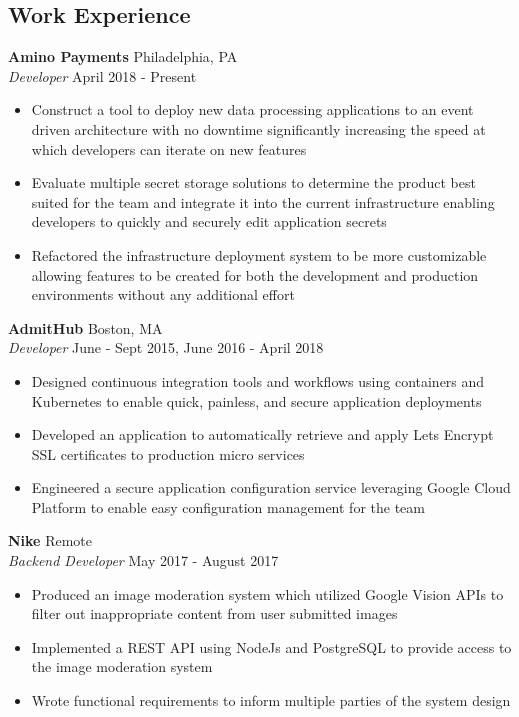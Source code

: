 \documentclass[10pt]{article}
\begin{document}
\begin{flushleft}
\section{Work Experience}
	\textbf{Amino Payments} \hfill Philadelphia, PA \\
	\textit{Developer} \hfill April 2018 - Present \\
	\begin{itemize}
		\item Construct a tool to deploy new data processing 
		      applications to an event driven architecture with no 
		      downtime significantly increasing the speed at which
		      developers can iterate on new features
	        \item Evaluate multiple secret storage solutions to determine 
		      the product best suited for the team and integrate it 
		      into the current infrastructure enabling developers to 
		      quickly and securely edit application secrets
	        \item Refactored the infrastructure deployment system to be more 
		      customizable allowing features to be created for both the 
		      development and production environments without any 
		      additional effort
	\end{itemize}


	\vspace{0.5em}
	\textbf{AdmitHub} \hfill Boston, MA \\
	\textit{Developer} \hfill June - Sept 2015, June 2016 - April 2018 \\
	\begin{itemize}
		\item Designed continuous integration tools and workflows using 
		      containers and Kubernetes to enable quick, painless, and 
		      secure application deployments
		\item Developed an application to automatically retrieve and 
		      apply Lets Encrypt SSL certificates to production micro 
		      services
		\item Engineered a secure application configuration service 
		      leveraging Google Cloud Platform to enable easy 
		      configuration management for the team
	\end{itemize}

	\vspace{0.5em}
	\textbf{Nike} \hfill Remote \\
	\textit{Backend Developer} \hfill May 2017 - August 2017 \\
	\begin{itemize}
		\item Produced an image moderation system which utilized 
		      Google Vision APIs to filter out inappropriate content 
		      from user submitted images
		\item Implemented a REST API using NodeJs and PostgreSQL to 
		      provide access to the image moderation system
		\item Wrote functional requirements to inform multiple parties  
		      of the system design
	\end{itemize}


\end{flushleft}
\end{document}
